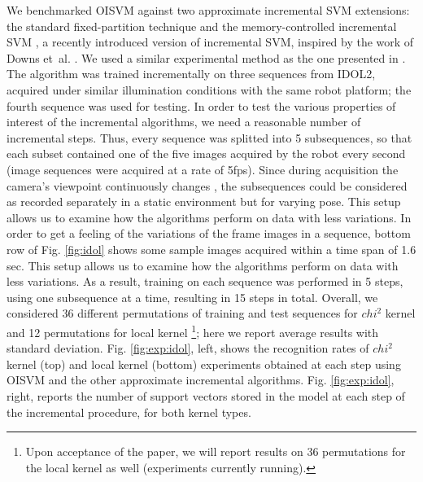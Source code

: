 We benchmarked  OISVM against two approximate incremental SVM extensions: the
standard fixed-partition technique \cite{syed99incremental} and the memory-controlled
incremental SVM \cite{luo:icra07}, a recently introduced version of incremental
SVM, inspired by the work of Downs et~al. \cite{DownsGM01}. We used a similar
experimental method as the one presented in \cite{luo:icra07}. The algorithm was
trained incrementally on three sequences from IDOL2, acquired under similar
illumination conditions with the same robot platform; the fourth sequence was
used for testing. In order to test the various properties of interest of the
incremental algorithms, we need a reasonable number of incremental steps.
Thus, every sequence was splitted into 5 subsequences, so that each subset 
contained one of the five images acquired by the robot every second (image
sequences were acquired at a rate of 5fps). Since during acquisition the camera's
viewpoint continuously changes \cite{luo:icra07}, the subsequences could be
considered as recorded separately in a static environment but for varying pose.
This setup allows us to examine how the algorithms perform on data with less
variations. In order to get a feeling of the variations of the frame images in a
sequence, bottom row of Fig. \ref{fig:idol} shows some sample images acquired
within a time span of 1.6 sec. This setup allows us to examine how the algorithms
perform on data with less variations. As a result, training on each sequence was
performed in 5 steps, using one subsequence at a time, resulting in 15 steps in 
total. Overall, we considered 36 different permutations of training and test
sequences for $chi^2$ kernel and 12 permutations for local kernel 
\footnote{Upon acceptance of the paper, we will report results
on 36 permutations for the local kernel as well (experiments currently running).}; 
here we report average results with standard deviation. 
Fig. \ref{fig:exp:idol}, left, shows the recognition rates of $chi^2$ kernel (top)
and local kernel (bottom) experiments obtained at each step using OISVM and the
other approximate incremental algorithms. Fig. \ref{fig:exp:idol}, right, reports
the number of support vectors stored in the model at each step of the incremental
procedure, for both kernel types.

